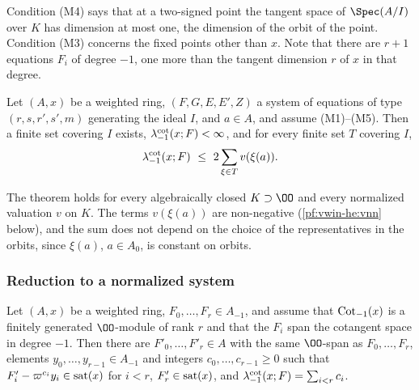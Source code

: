 Condition (M4) says that at a two-signed point the tangent space of $\Spec(A/I)$ over $K$ has dimension at most one,
the dimension of the orbit of the point. Condition (M3) concerns the fixed points other than $x$. Note that there
are $r+1$ equations $F_i$ of degree $-1$, one more than the tangent dimension $r$ of $x$ in that degree.

\begin{theorem}[Lemma M]\label{pf:vwin-he:lemmaM}
Let $(A,x)$ be a weighted ring, $(F,G,E,E',Z)$ a system of equations of type $(r,s,r',s',m)$ generating the ideal
$I$, and $a\in A$, and assume \textup{(M1)}--\textup{(M5)}. Then a finite set covering $I$ exists,
$\lambda^{\mathrm{cot}}_{-1}(x;F)<\infty$, and for every finite set $T$ covering $I$,
\[
 \lambda^{\mathrm{cot}}_{-1}(x;F)\ \le\ 2\sum_{\xi\in T}v(\xi(a)).
\]
\end{theorem}

The theorem holds for every algebraically closed $K\supset\OO$ and every normalized valuation $v$ on $K$. The terms
$v(\xi(a))$ are non-negative (\cref{pf:vwin-he:vnn} below), and the sum does not depend on
the choice of the representatives in the orbits, since $\xi(a)$, $a\in A_0$, is constant on orbits.

\subsubsection{Reduction to a normalized system}

\begin{lemma}\label{pf:vwin-he:sm}
Let $(A,x)$ be a weighted ring, $F_0,\dots,F_r\in A_{-1}$, and assume that $\operatorname{Cot}_{-1}(x)$ is a finitely
generated $\OO$-module of rank $r$ and that the $F_i$ span the cotangent space in degree $-1$. Then there are
$F'_0,\dots,F'_r\in A$ with the same $\OO$-span as $F_0,\dots,F_r$, elements $y_0,\dots,y_{r-1}\in A_{-1}$ and
integers $c_0,\dots,c_{r-1}\ge0$ such that $F'_i-\varpi^{c_i}y_i\in\operatorname{sat}(x)$ for $i<r$,
$F'_r\in\operatorname{sat}(x)$, and $\lambda^{\mathrm{cot}}_{-1}(x;F)=\sum_{i<r}c_i$.
\end{lemma}

